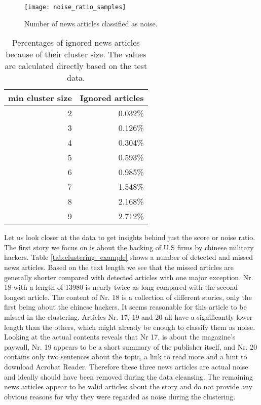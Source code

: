 \begin{figure}[h]
    \centering
    \texttt{[image: noise\_ratio\_samples]}
    \caption{Number of news articles classified as noise.}
    \label{fig:noise_ratio_samples}
\end{figure}

\begin{table}[h]
    \centering
    \begin{tabular}{|r|r|}
        \hline
        \textbf{min cluster size} & \textbf{Ignored articles} \\
        \hline
        2 & 0.032\% \\ \hline
        3 & 0.126\% \\ \hline
        4 & 0.304\% \\ \hline
        5 & 0.593\% \\ \hline
        6 & 0.985\% \\ \hline
        7 & 1.548\% \\ \hline
        8 & 2.168\% \\ \hline
        9 & 2.712\% \\ \hline
    \end{tabular}
    \caption{Percentages of ignored news articles because of their cluster size. The values are calculated directly based on the test data.}
    \label{tab:expected_noise}
\end{table}

Let us look closer at the data to get insights behind just the score or noise ratio. The first story we focus on is about the hacking of U.S firms by chinese military hackers. Table \ref{tab:clustering_example} shows a number of detected and missed news articles. Based on the text length we see that the missed articles are generally shorter compared with detected articles with one major exception. Nr. 18 with a length of 13980 is nearly twice as long compared with the second longest article. The content of Nr. 18 is a collection of different stories, only the first being about the chinese hackers. It seems reasonable for this article to be missed in the clustering. Articles Nr. 17, 19 and 20 all have a significantly lower length than the others, which might already be enough to classify them as noise. Looking at the actual contents reveals that Nr 17. is about the magazine's paywall, Nr. 19 appears to be a short summary of the publisher itself, and Nr. 20 contains only two sentences about the topic, a link to read more and a hint to download Acrobat Reader. Therefore these three news articles are actual noise and ideally should have been removed during the data cleansing. The remaining news articles appear to be valid articles about the story and do not provide any obvious reasons for why they were regarded as noise during the clustering.


